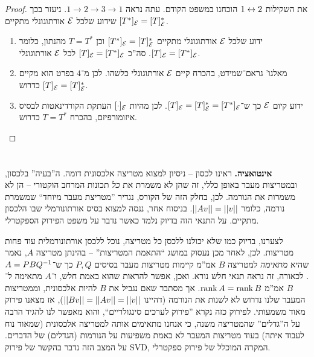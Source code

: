 \documentclass[name=רשימות אלגברה לינארית 2א]{../../../tex/classes/megasumPreamble}
\begin{document}
	\begin{proof}
		את השקילות $1\leftrightarrow 2$ הוכחנו במשפט הקודם. עתה נראה $1\to2\to3\to1$. ניעזר בכך שידוע שלכל $\mathcal{E}$ אורתוגונלי מתקיים $[T^*]_{\mathcal{E}} = [T]_{\mathcal{E}}^*$. 
		\begin{enumerate}
			\item[$1 \to 2$] ידוע שלכל $\mathcal{E}$ אורתוגונלי מתקיים $[T^*]_{\mathcal{E}} = [T]_{\mathcal{E}}^*$ וכן $T = T^*$ מהנתון, כלומר $[T]_{\mathcal{E}} = [T^*]_{\mathcal{E}}$. סה''כ $[T]_{\mathcal{E}} = [T^*]_{\mathcal{E}}$ לכל $\mathcal{E}$ אורתוגונלי. 
			\item[$2 \to 3$] מאלגו' גראם־שמידט, בהכרח קיים $\mathcal{E}$ אורתוגונלי כלשהו. לכן מ־$4$ בפרט הוא מקיים $[T]_{\mathcal{E}} = [T]_{\mathcal{E}}^*$ כדרוש. 
			\item[$3 \to 1$] ידוע קיום $\mathcal{E}$ כך ש־$[T]_{\mathcal{E}} = [T]_{\mathcal{E}}^* = [T^*]_{\mathcal{E}}$. לכן מהיות $[\cdot]_{\mathcal{E}}$ העתקת הקורדינאטות לבסיס איזומורפיזם, בהכרח $T = T^*$ כדרוש. 
		\end{enumerate}\envendproof
	\end{proof}
	
	
	\npage
	\section[פירוקים]{}
	\textbf{אינטואציה. }ראינו לכסון – ניסיון למצוא מטריצה אלכסונית דומה. ה''בעיה'' בלכסון, ובמטריצות מעבר באופן כללי, זה שהן לא משמרת את \textit{כל} תכונות המרחב הוקטורי – הן לא משמרות את הנורמה. לכן, בחלק הזה של הקורס, נגדיר ''מטריצת מעבר מיוחד`` שמשמרת נורמה, כלומר $\left \vert \left \vert Av \right \vert \right \vert = \left \vert \left \vert v \right \vert \right \vert$. בניסוח אחר, ננסה למצוא בסיס אורתונורמלי שבו הלכסון מתקיים. על התנאי הזה בדיוק נלמד כאשר נדבר על משפט הפירוק הספקטרלי. 
	
	לצערנו, בדיוק כמו שלא יכולנו ללכסן כל מטריצה, נוכל ללכסן אורתונורמלית עוד פחות מטריצות. לכן, לאחר מכן נעסוק במושג ``התאמת המטריצות'' – בהינתן מטריצה $A$, נאמר שהיא \textit{מתאימה} למטריצה $B$ אמ''מ קיימות מטריצות מעבר בסיסים $P, Q$ כך ש־$A = P B Q^{-1}$. לכאורה, זה נראה תנאי חלש נורא. ואכן, אפשר להראות שהוא באמת חלש, ו־$A$ מתאימה ל־$B$ אמ''מ $\operatorname{rank} A = \operatorname{rank} B$. אך מסתבר שאם נגביל את $B$ להיות אלכסונית, וממטריצות המעבר שלנו נדרוש לא לשנות את הנורמה (דהיינו $\left \vert \left \vert Bv \right \vert \right \vert = \left \vert \left \vert Av \right \vert \right \vert = \left \vert \left \vert v \right \vert \right \vert$), אז מצאנו פירוק מאוד משמעותי. לפירוק כזה נקרא ''פירוק לערכים סינגולריים``, והוא מאפשר לנו להגיד הרבה על ה''גדלים'' שהמטריצה משנה, כי אנחנו מתאימים אותה למטריצה אלכסונית (שמאוד נוח לעבוד איתה) בעוד מטריצות המעבר לא באמת משפיעות על הנורמות (הגדלים) של הדברים. על המצב הזה נדבר בהקשר של פירוק SVD, המקרה המוכלל של פירוק ספקטרלי. 
	
\end{document}
